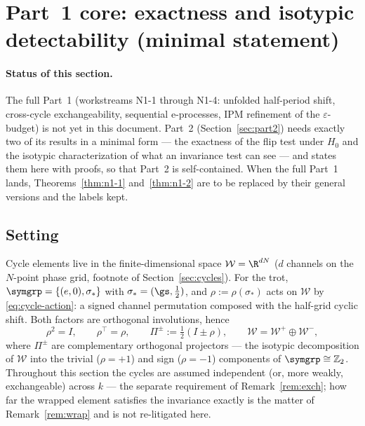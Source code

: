 \section{Part~1 core: exactness and isotypic detectability (minimal statement)}
\label{sec:part1core}

\paragraph{Status of this section.}
The full Part~1 (workstreams N1-1 through N1-4: unfolded half-period shift,
cross-cycle exchangeability, sequential e-processes, IPM refinement of the
$\varepsilon$-budget) is not yet in this document. Part~2
(Section~\ref{sec:part2}) needs exactly two of its results in a minimal form
--- the exactness of the flip test under $H_0$ and the isotypic
characterization of what an invariance test can see --- and states them here
with proofs, so that Part~2 is self-contained. When the full Part~1 lands,
Theorems~\ref{thm:n1-1} and~\ref{thm:n1-2} are to be replaced by their general
versions and the labels kept.

\subsection{Setting}
\label{sec:p1-setting}

Cycle elements live in the finite-dimensional space $\mathcal{W} = \R^{dN}$
($d$ channels on the $N$-point phase grid, footnote of
Section~\ref{sec:cycles}). For the trot, $\symgrp = \{(e,0),\sigma_*\}$ with
$\sigma_* = (\gs,\tfrac12)$, and $\rho := \rho(\sigma_*)$ acts on
$\mathcal{W}$ by \eqref{eq:cycle-action}: a signed channel permutation
composed with the half-grid cyclic shift. Both factors are orthogonal
involutions, hence
\begin{equation}
  \label{eq:rho-involution}
  \rho^{2} = I, \qquad \rho^{\top} = \rho, \qquad
  \Pi^{\pm} := \tfrac12 (I \pm \rho), \qquad
  \mathcal{W} = \mathcal{W}^{+} \oplus \mathcal{W}^{-},
\end{equation}
where $\Pi^{\pm}$ are complementary orthogonal projectors ---
the isotypic decomposition of $\mathcal{W}$ into the trivial ($\rho = +1$)
and sign ($\rho = -1$) components of $\symgrp \cong \mathbb{Z}_2$.
Throughout this section the cycles are assumed independent (or, more weakly,
exchangeable) across $k$ --- the separate requirement of
Remark~\ref{rem:exch}; how far the wrapped element satisfies the invariance
exactly is the matter of Remark~\ref{rem:wrap} and is not re-litigated here.

